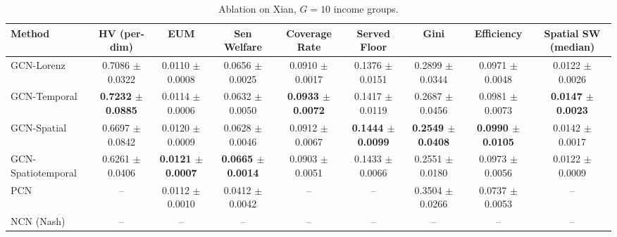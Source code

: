 \begin{table}[htbp]
\centering
\caption{Ablation on Xian, $G=10$ income groups.}
\label{tab:ablation_xian_g10}
\begin{tabular}{lcccccccc}
\toprule
Method & HV (per-dim) & EUM & Sen Welfare & Coverage Rate & Served Floor & Gini & Efficiency & Spatial SW (median) \\
\midrule
GCN-Lorenz & 0.7086 $\pm$ 0.0322 & 0.0110 $\pm$ 0.0008 & 0.0656 $\pm$ 0.0025 & 0.0910 $\pm$ 0.0017 & 0.1376 $\pm$ 0.0151 & 0.2899 $\pm$ 0.0344 & 0.0971 $\pm$ 0.0048 & 0.0122 $\pm$ 0.0026 \\
GCN-Temporal & \textbf{0.7232 $\pm$ 0.0885} & 0.0114 $\pm$ 0.0006 & 0.0632 $\pm$ 0.0050 & \textbf{0.0933 $\pm$ 0.0072} & 0.1417 $\pm$ 0.0119 & 0.2687 $\pm$ 0.0456 & 0.0981 $\pm$ 0.0073 & \textbf{0.0147 $\pm$ 0.0023} \\
GCN-Spatial & 0.6697 $\pm$ 0.0842 & 0.0120 $\pm$ 0.0009 & 0.0628 $\pm$ 0.0046 & 0.0912 $\pm$ 0.0067 & \textbf{0.1444 $\pm$ 0.0099} & \textbf{0.2549 $\pm$ 0.0408} & \textbf{0.0990 $\pm$ 0.0105} & 0.0142 $\pm$ 0.0017 \\
GCN-Spatiotemporal & 0.6261 $\pm$ 0.0406 & \textbf{0.0121 $\pm$ 0.0007} & \textbf{0.0665 $\pm$ 0.0014} & 0.0903 $\pm$ 0.0051 & 0.1433 $\pm$ 0.0066 & 0.2551 $\pm$ 0.0180 & 0.0973 $\pm$ 0.0056 & 0.0122 $\pm$ 0.0009 \\
PCN & -- & 0.0112 $\pm$ 0.0010 & 0.0412 $\pm$ 0.0042 & -- & -- & 0.3504 $\pm$ 0.0266 & 0.0737 $\pm$ 0.0053 & -- \\
NCN (Nash) & -- & -- & -- & -- & -- & -- & -- & -- \\
\bottomrule
\end{tabular}
\end{table}


